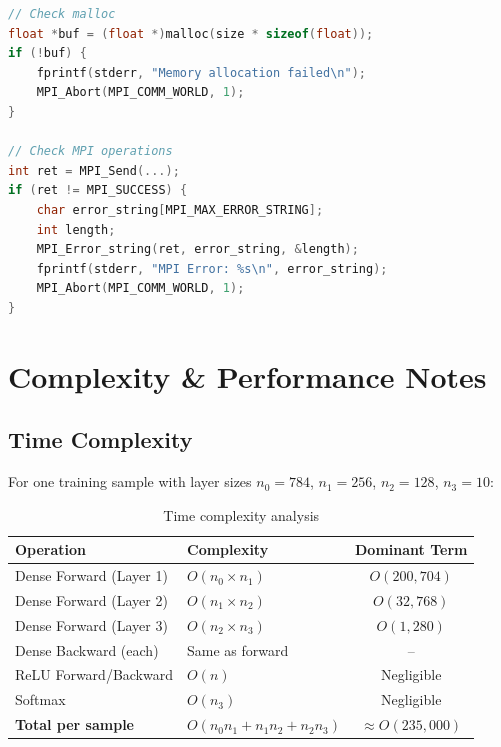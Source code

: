 \documentclass[11pt,a4paper]{article}
\begin{document}
\begin{lstlisting}[language=C, caption={Recommended error checking}]
// Check malloc
float *buf = (float *)malloc(size * sizeof(float));
if (!buf) {
    fprintf(stderr, "Memory allocation failed\n");
    MPI_Abort(MPI_COMM_WORLD, 1);
}

// Check MPI operations
int ret = MPI_Send(...);
if (ret != MPI_SUCCESS) {
    char error_string[MPI_MAX_ERROR_STRING];
    int length;
    MPI_Error_string(ret, error_string, &length);
    fprintf(stderr, "MPI Error: %s\n", error_string);
    MPI_Abort(MPI_COMM_WORLD, 1);
}
\end{lstlisting}

\section{Complexity \& Performance Notes}

\subsection{Time Complexity}

For one training sample with layer sizes $n_0 = 784$, $n_1 = 256$, $n_2 = 128$, $n_3 = 10$:

\begin{table}[h]
\centering
\begin{tabular}{@{}llc@{}}
\toprule
\textbf{Operation} & \textbf{Complexity} & \textbf{Dominant Term} \\
\midrule
Dense Forward (Layer 1) & $O(n_0 \times n_1)$ & $O(200,704)$ \\
Dense Forward (Layer 2) & $O(n_1 \times n_2)$ & $O(32,768)$ \\
Dense Forward (Layer 3) & $O(n_2 \times n_3)$ & $O(1,280)$ \\
Dense Backward (each) & Same as forward & -- \\
ReLU Forward/Backward & $O(n)$ & Negligible \\
Softmax & $O(n_3)$ & Negligible \\
\midrule
\textbf{Total per sample} & $O(n_0 n_1 + n_1 n_2 + n_2 n_3)$ & $\approx O(235,000)$ \\
\bottomrule
\end{tabular}
\caption{Time complexity analysis}
\end{table}
\end{document}
